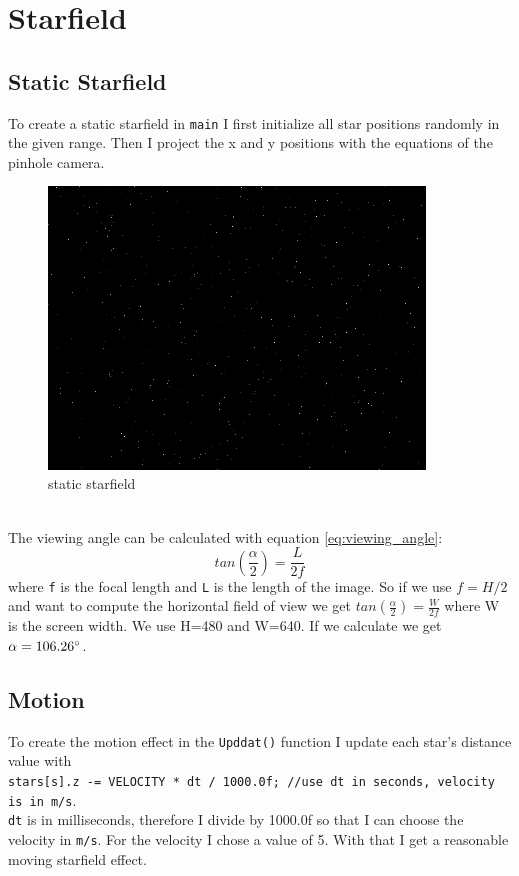 \section{Starfield}
\subsection{Static Starfield}
To create a static starfield in \texttt{main} I first initialize all star positions randomly in the given range. Then I project the x and y positions with the
equations of the pinhole camera.\\
\begin{figure}[ht]
    \begin{center}
        \includegraphics[width=10cm]{screenshots/static_starfield.png}
        \caption{static starfield}
    \end{center}
\end{figure}
\\
The viewing angle can be calculated with equation \eqref{eq:viewing_angle}:
\begin{equation}\label{eq:viewing_angle}
    tan(\frac{\alpha}{2})=\frac{L}{2f}
\end{equation}
where \texttt{f} is the focal length and \texttt{L} is the length of the image. So if we use \(f=H/2\) and want to compute the horizontal field of view we get
\(tan(\frac{\alpha}{2})=\frac{W}{2f}\) where W is the screen width. We use H=480 and W=640. If we calculate we get \(\alpha=106.26\degree\).

\subsection{Motion}
To create the motion effect in the \texttt{Upddat()} function I update each star's distance value with \\
\texttt{stars[s].z -= VELOCITY * dt / 1000.0f; //use dt in seconds, velocity is in m/s}. \\
\texttt{dt} is in milliseconds, therefore I divide by 1000.0f so 
that I can choose the velocity in \texttt{m/s}. For the velocity I chose a value of 5. With that I get a reasonable moving starfield effect.